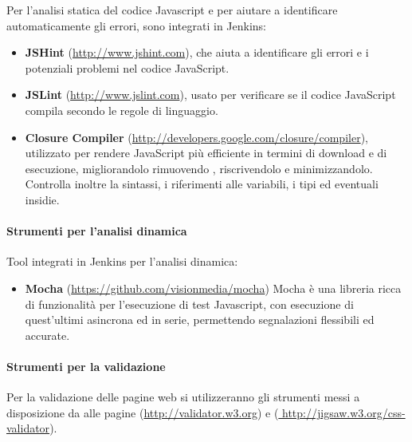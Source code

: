 		Per l'analisi statica del codice Javascript e per aiutare a identificare automaticamente gli errori, sono integrati in
		Jenkins:
		\begin{itemize}
		\item \textbf{JSHint} (\url{http://www.jshint.com}), che aiuta a identificare gli errori e i potenziali
		problemi nel
		codice JavaScript.
		\item \textbf{JSLint} (\url{http://www.jslint.com}),  usato per verificare se il codice JavaScript compila
		secondo le regole di linguaggio.
		\item \textbf{Closure Compiler} (\url{http://developers.google.com/closure/compiler}),  utilizzato per
		rendere JavaScript più efficiente in termini di download e di esecuzione, migliorandolo rimuovendo  , riscrivendolo e minimizzandolo. Controlla inoltre la sintassi, i riferimenti alle variabili, i tipi ed eventuali
		insidie.
		\end{itemize}
		
		\paragraph{Strumenti per l'analisi dinamica} 
		Tool integrati in Jenkins per l'analisi dinamica: 
		\begin{itemize}
		\item \textbf{Mocha} (\url{https://github.com/visionmedia/mocha}) Mocha è una libreria ricca di funzionalità per l'esecuzione
		di test Javascript, con esecuzione di quest'ultimi asincrona ed in serie, permettendo segnalazioni flessibili ed accurate.
		\end{itemize}
	
			
		\paragraph{Strumenti per la validazione}
		Per la validazione delle pagine web si utilizzeranno gli strumenti messi a disposizione da  alle pagine 
		 (\url{http://validator.w3.org}) e (\url{ http://jigsaw.w3.org/css-validator}).			
		





